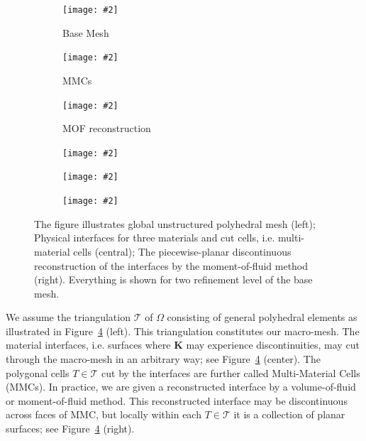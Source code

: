\documentclass[12pt]{article}
\newcommand{\includegraphicsw}[2][1.]{\texttt{[image: \#2]}}
\newcommand{\vect}[1]{\boldsymbol{\mathbf{#1}}}
\newcommand{\bcell}{T}
\newcommand{\bmesh}{{\vect{\mathcal T}}}
\begin{document}
\begin{figure}[h]
	\centering
	\begin{subfigure}{.33\linewidth}
		\centering
		\includegraphicsw{ring_base_voronoi.png}
		\caption{Base Mesh}
		\label{fig:problem_geometry:base_mesh}
	\end{subfigure}%
	\hfill
	\begin{subfigure}{.33\linewidth}
		\centering
		\includegraphicsw{ring_mmcs_voronoi.png}
		\caption{MMCs}
		\label{fig:problem_geometry:mmcs}
	\end{subfigure}%
	\hfill
	\begin{subfigure}{.33\linewidth}
		\centering
		\includegraphicsw{ring_mini_voronoi.png}
		\caption{MOF reconstruction}
		\label{fig:problem_geometry:mof}
	\end{subfigure}
	\begin{subfigure}{.33\linewidth}
		\centering
		\includegraphicsw{ring_base_voronoi_refined.png}
	\end{subfigure}%
	\hfill
	\begin{subfigure}{.33\linewidth}
		\centering
		\includegraphicsw{ring_mmcs_voronoi_refined.png}
	\end{subfigure}%
	\hfill
	\begin{subfigure}{.33\linewidth}
		\centering
		\includegraphicsw{ring_mini_voronoi_refined.png}
	\end{subfigure}
	\caption{The figure illustrates global unstructured polyhedral mesh (left); Physical interfaces for three materials and cut cells, i.e. multi-material cells (central); The piecewise-planar discontinuous reconstruction of the interfaces by the moment-of-fluid method (right). Everything is shown for two refinement level of the base mesh. \label{fig:problem_geometry}}
\end{figure}
	
We assume the triangulation  $\bmesh$ of $\Omega$ consisting of general polyhedral elements as illustrated in Figure~\ref{fig:problem_geometry} (left). This triangulation constitutes our macro-mesh. The material interfaces, i.e. surfaces where $\vect K$ may experience discontinuities, may cut through the macro-mesh in an arbitrary way; see Figure~\ref{fig:problem_geometry} (center). The polygonal cells ${\bcell \in \bmesh}$ cut by the interfaces are further called Multi-Material Cells (MMCs). In practice,  we are given a reconstructed interface by a volume-of-fluid or moment-of-fluid method. This reconstructed interface may be discontinuous across faces of MMC, but locally within each ${\bcell \in \bmesh}$ it is a collection of planar surfaces; see Figure~\ref{fig:problem_geometry} (right).
\end{document}
